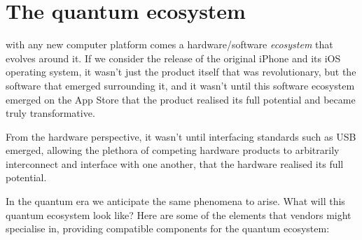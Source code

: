 %
%

\section{The quantum ecosystem}

\newline

 with any new computer platform comes a hardware/software \textit{ecosystem} that evolves around it. If we consider the release of the original iPhone and its iOS operating system, it wasn't just the product itself that was revolutionary, but the software that emerged surrounding it, and it wasn't until this software ecosystem emerged on the App Store that the product realised its full potential and became truly transformative.

From the hardware perspective, it wasn't until interfacing standards such as USB emerged, allowing the plethora of competing hardware products to arbitrarily interconnect and interface with one another, that the hardware realised its full potential.

In the quantum era we anticipate the same phenomena to arise. What will this quantum ecosystem look like? Here are some of the elements that vendors might specialise in, providing compatible components for the quantum ecosystem:

